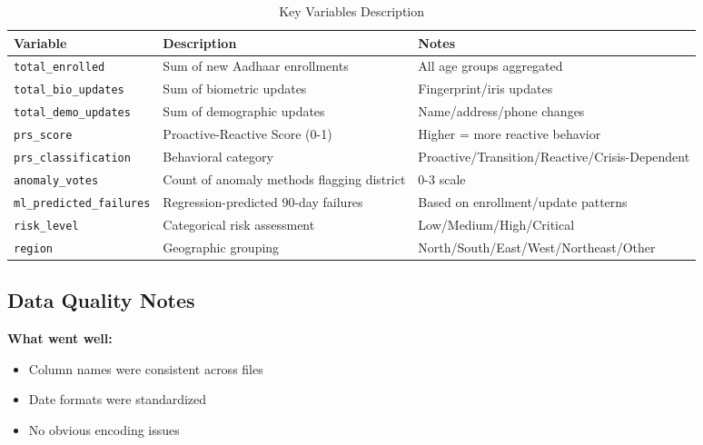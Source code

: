 \documentclass[11pt, a4paper]{article}
\begin{document}
\vspace{0.8em}
\begin{table}[H]
\caption{Key Variables Description}
{\small
\begin{tabularx}{\textwidth}{|Y|Y|Y|}
\hline
\textbf{Variable} & \textbf{Description} & \textbf{Notes} \\ \hline
\texttt{total\_enrolled} & Sum of new Aadhaar enrollments & All age groups aggregated \\ \hline
\texttt{total\_bio\_updates} & Sum of biometric updates & Fingerprint/\allowbreak iris updates \\ \hline
\texttt{total\_demo\_updates} & Sum of demographic updates & Name/\allowbreak address/\allowbreak phone changes \\ \hline
\texttt{prs\_score} & Proactive-Reactive Score (0-1) & Higher = more reactive behavior \\ \hline
\texttt{prs\_classification} & Behavioral category & Proactive/\allowbreak Transition/\allowbreak Reactive/\allowbreak Crisis-Dependent \\ \hline
\texttt{anomaly\_votes} & Count of anomaly methods flagging district & 0-3 scale \\ \hline
\texttt{ml\_predicted\_failures} & Regression-predicted 90-day failures & Based on enrollment/\allowbreak update patterns \\ \hline
\texttt{risk\_level} & Categorical risk assessment & Low/\allowbreak Medium/\allowbreak High/\allowbreak Critical \\ \hline
\texttt{region} & Geographic grouping & North/\allowbreak South/\allowbreak East/\allowbreak West/\allowbreak Northeast/\allowbreak Other \\ \hline
\end{tabularx}
}
\end{table}
\vspace{1em}

\subsection{Data Quality Notes}

\textbf{What went well:}


\begin{itemize}
\item Column names were consistent across files

\item Date formats were standardized

\item No obvious encoding issues
\end{itemize}
\end{document}

